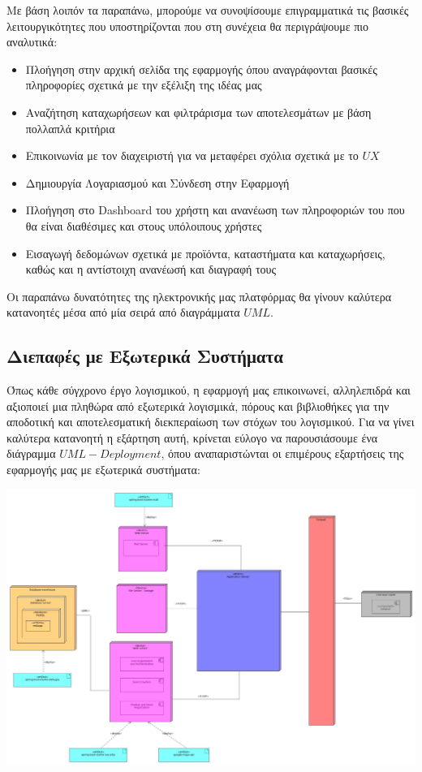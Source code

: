 \documentclass[12pt]{article}
\begin{document}
Με βάση λοιπόν τα παραπάνω, μπορούμε να συνοψίσουμε επιγραμματικά τις βασικές λειτουργικότητες που υποστηρίζονται που στη συνέχεια θα περιγράψουμε πιο αναλυτικά:

\begin{itemize}
\item Πλοήγηση στην αρχική σελίδα της εφαρμογής όπου αναγράφονται βασικές πληροφορίες σχετικά με την εξέλιξη της ιδέας μας
\item Αναζήτηση καταχωρήσεων και φιλτράρισμα των αποτελεσμάτων με βάση πολλαπλά κριτήρια
\item Επικοινωνία με τον διαχειριστή για να μεταφέρει σχόλια σχετικά με το $UX$
\item Δημιουργία Λογαριασμού και Σύνδεση στην Εφαρμογή
\item Πλοήγηση στο Dashboard του χρήστη και ανανέωση των πληροφοριών του που θα είναι διαθέσιμες και στους υπόλοιπους χρήστες
\item Εισαγωγή δεδομώνων σχετικά με προϊόντα, καταστήματα και καταχωρήσεις, καθώς και η αντίστοιχη ανανέωσή και διαγραφή τους
\end{itemize}

Οι παραπάνω δυνατότητες της ηλεκτρονικής μας πλατφόρμας θα γίνουν καλύτερα κατανοητές μέσα από μία σειρά από διαγράμματα $UML$. 

\newpage

\subsection{Διεπαφές με Εξωτερικά Συστήματα}

Όπως κάθε σύγχρονο έργο λογισμικού, η εφαρμογή μας επικοινωνεί, αλληλεπιδρά και αξιοποιεί μια πληθώρα από εξωτερικά λογισμικά, πόρους και βιβλιοθήκες για την αποδοτική και αποτελεσματική διεκπεραίωση των στόχων του λογισμικού. Για να γίνει καλύτερα κατανοητή η εξάρτηση αυτή, κρίνεται εύλογο να παρουσιάσουμε ένα διάγραμμα $UML-Deployment$, όπου αναπαριστώνται οι επιμέρους εξαρτήσεις της εφαρμογής μας με εξωτερικά συστήματα:

\begin{center}
\includegraphics[scale=0.22]{UML/deploymentDiagram.jpg}
\end{center}
\end{document}
